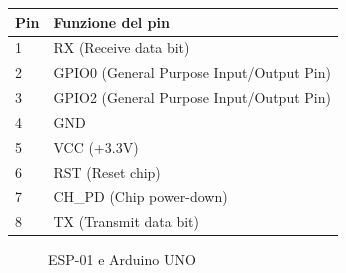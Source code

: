 \documentclass[12pt]{report}
\begin{document}
\vspace{\baselineskip}
\begin{minipage}{\textwidth}
	\begin{minipage}[b]{0.35\textwidth}
		\label{fig:esp_pinout_img}
	\end{minipage}
	\hfill
	\begin{minipage}[b]{0.65\textwidth}
		\centering
		\begin{tabular}{l|l}
			\textbf{Pin} & \textbf{Funzione del pin} \\
			\hline
			1 & RX (Receive data bit) \\
			2 & GPIO0 (General Purpose Input/Output Pin) \\
			3 & GPIO2 (General Purpose Input/Output Pin) \\
			4 & GND \\
			5 & VCC (+3.3V) \\
			6 & RST (Reset chip) \\
			7 & CH\_PD (Chip power-down) \\
			8 & TX (Transmit data bit) \\
		\end{tabular}
		\label{tab:esp01_pinout}
	\end{minipage}
\end{minipage}
\vspace{\baselineskip}

\begin{figure}[H]
	\caption{ESP-01 e Arduino UNO}
	\label{fig:esp_uno}
\end{figure}
\end{document}
